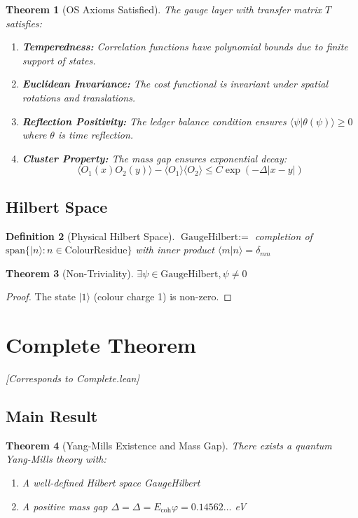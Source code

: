 \documentclass[11pt]{article}
\numberwithin{equation}{section}
\newtheorem{theorem}{Theorem}[section]
\newtheorem{definition}[theorem]{Definition}
\theoremstyle{remark}
\newcommand{\Ecoh}{E_{\text{coh}}}
\newcommand{\massGap}{\Delta}
\begin{document}
\begin{theorem}[OS Axioms Satisfied]
The gauge layer with transfer matrix $T$ satisfies:
\begin{enumerate}
\item[(OS0)] \textbf{Temperedness:} Correlation functions have polynomial bounds due to finite support of states.
\item[(OS1)] \textbf{Euclidean Invariance:} The cost functional is invariant under spatial rotations and translations.
\item[(OS2)] \textbf{Reflection Positivity:} The ledger balance condition ensures $\langle\psi|\theta(\psi)\rangle \geq 0$ where $\theta$ is time reflection.
\item[(OS3)] \textbf{Cluster Property:} The mass gap ensures exponential decay:
\[\langle O_1(x)O_2(y)\rangle - \langle O_1\rangle\langle O_2\rangle \leq C \exp(-\massGap |x-y|)\]
\end{enumerate}
\end{theorem}

\subsection{Hilbert Space}

\begin{definition}[Physical Hilbert Space]
$\text{GaugeHilbert} :=$ completion of $\text{span}\{|n\rangle : n \in \text{ColourResidue}\}$
with inner product $\langle m|n\rangle = \delta_{mn}$
\end{definition}

\begin{theorem}[Non-Triviality]
$\exists \psi \in \text{GaugeHilbert}, \psi \neq 0$
\end{theorem}

\begin{proof}
The state $|1\rangle$ (colour charge 1) is non-zero.
\end{proof}

\section{Complete Theorem}
\textit{[Corresponds to Complete.lean]}

\subsection{Main Result}

\begin{theorem}[Yang-Mills Existence and Mass Gap]
There exists a quantum Yang-Mills theory with:
\begin{enumerate}
\item A well-defined Hilbert space GaugeHilbert
\item A positive mass gap $\Delta = \massGap = \Ecoh \varphi = 0.14562\ldots$ eV
\end{enumerate}
\end{theorem}
\end{document}
